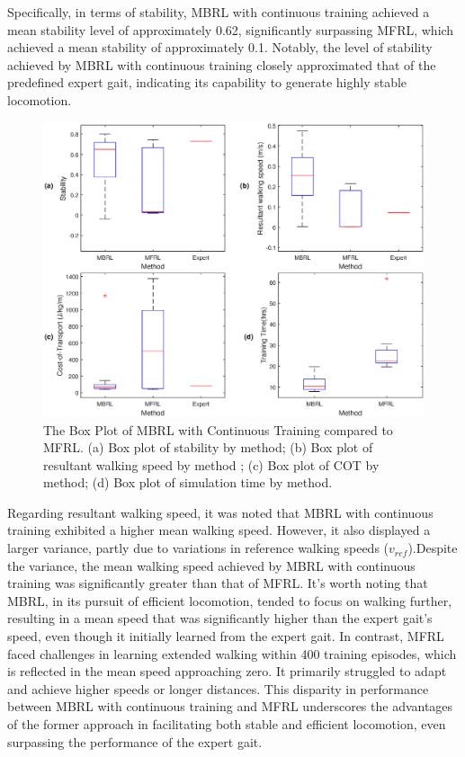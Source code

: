 Specifically, in terms of stability, MBRL with continuous training achieved a mean stability level of approximately 0.62, significantly surpassing MFRL, which achieved a mean stability of approximately 0.1. Notably, the level of stability achieved by MBRL with continuous training closely approximated that of the predefined expert gait, indicating its capability to generate highly stable locomotion. 
\begin{figure}[htb]
    \centering
    \includegraphics[width=\linewidth]{img/chap5/box_results.eps}
    \caption{The Box Plot of MBRL with Continuous Training compared to MFRL. (a) Box plot of stability by method; (b) Box plot of resultant walking speed by method ; (c) Box plot of COT by method; (d) Box plot of simulation time by method.}
    \label{fig:box}
\end{figure}

Regarding resultant walking speed, it was noted that MBRL with continuous training exhibited a higher mean walking speed. However, it also displayed a larger variance, partly due to variations in reference walking speeds ($v_{ref}$).Despite the variance, the mean walking speed achieved by MBRL with continuous training was significantly greater than that of MFRL. It's worth noting that MBRL, in its pursuit of efficient locomotion, tended to focus on walking further, resulting in a mean speed that was significantly higher than the expert gait's speed, even though it initially learned from the expert gait. In contrast, MFRL faced challenges in learning extended walking within 400 training episodes, which is reflected in the mean speed approaching zero. It primarily struggled to adapt and achieve higher speeds or longer distances. This disparity in performance between MBRL with continuous training and MFRL underscores the advantages of the former approach in facilitating both stable and efficient locomotion, even surpassing the performance of the expert gait. 

